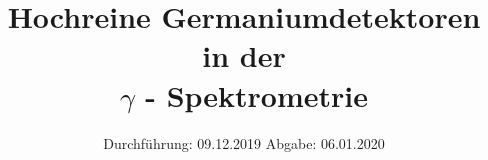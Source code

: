 
\usepackage{longtable}
\usepackage{wrapfig}
\usepackage{ dsfont }
\subject{VERSUCH 18}
\title{Hochreine Germaniumdetektoren in der\\ \texorpdfstring{$\gamma$}. - Spektrometrie}
\date{%
  \hspace{-2.5em}
  Durchführung: 09.12.2019
  \hspace{4em}
  Abgabe: 06.01.2020
}


  \setlength{\parindent}{0em}
  \maketitle
  \thispagestyle{empty}
  \newpage
  \tableofcontents
  \newpage





\printbibliography{}
%


